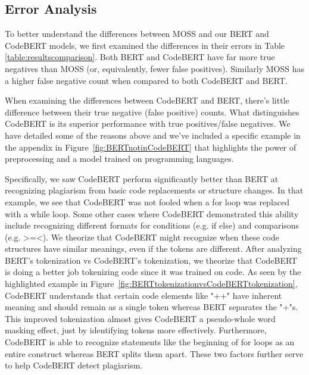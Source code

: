 \documentclass[twocolumn]{article}
\begin{document}
\subsection{\normalsize Error Analysis}

To better understand the differences between MOSS and our BERT and CodeBERT models, we first examined the differences in their errors in Table \ref{table:resultscomparison}. Both BERT and CodeBERT have far more true negatives than MOSS (or, equivalently, fewer false positives). Similarly MOSS has a higher false negative count when compared to both CodeBERT and BERT. 
 
 When examining the differences between CodeBERT and BERT, there's little difference between their true negative (false positive) counts. What distinguishes CodeBERT is its superior performance with true positives/false negatives. We have detailed some of the reasons above and we've included a specific example in the appendix in Figure~\ref{fig:BERTnotinCodeBERT} that highlights the power of preprocessing and a model trained on programming languages. 
 
 Specifically, we saw CodeBERT perform significantly better than BERT at recognizing plagiarism from basic code replacements or structure changes.  In that example, we see that CodeBERT was not fooled when a for loop was replaced with a while loop. Some other cases where CodeBERT demonstrated this ability include recognizing different formats for conditions (e.g. if else) and comparisons (e.g. >=<). We theorize that CodeBERT might recognize when these code structures have similar meanings, even if the tokens are different. After analyzing BERT's tokenization vs CodeBERT's tokenization, we theorize that CodeBERT is doing a better job tokenizing code since it was trained on code. As seen by the highlighted example in Figure~\ref{fig:BERTtokenizationvsCodeBERTtokenization}, CodeBERT understands that certain code elements like "++" have inherent meaning and should remain as a single token whereas BERT separates the "+"s. This improved tokenization almost gives CodeBERT a pseudo-whole word masking effect, just by identifying tokens more effectively. Furthermore, CodeBERT is able to recognize statements like the beginning of for loops as an entire construct whereas BERT splits them apart. These two factors further serve to help CodeBERT detect plagiarism.
\end{document}
